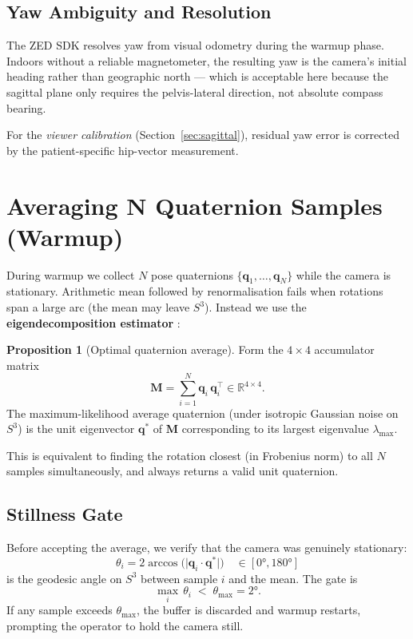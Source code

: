 \documentclass[11pt, a4paper]{article}
\newcommand{\R}{\mathbb{R}}
\newcommand{\mat}[1]{\mathbf{#1}}     %
\newcommand{\quat}[1]{\bm{#1}}        %
\theoremstyle{definition}
\newtheorem{prop}{Proposition}
\begin{document}
\subsection*{Yaw Ambiguity and Resolution}
The ZED SDK resolves yaw from visual odometry during the warmup phase.
Indoors without a reliable magnetometer, the resulting yaw is the camera's
initial heading rather than geographic north --- which is acceptable here
because the sagittal plane only requires the pelvis-lateral direction, not
absolute compass bearing.

For the \emph{viewer calibration} (Section~\ref{sec:sagittal}), residual yaw
error is corrected by the patient-specific hip-vector measurement.

\section{Averaging N Quaternion Samples (Warmup)}
\label{sec:avg_quat}

During warmup we collect $N$ pose quaternions
$\{\quat{q}_1, \dots, \quat{q}_N\}$ while the camera is stationary.
Arithmetic mean followed by renormalisation fails when rotations span
a large arc (the mean may leave $S^3$). Instead we use the
\textbf{eigendecomposition estimator} \cite{Markley2007}:

\begin{prop}[Optimal quaternion average]
Form the $4 \times 4$ accumulator matrix
\[
  \mat{M} = \sum_{i=1}^{N} \quat{q}_i\,\quat{q}_i^{\!\top} \in \R^{4\times 4}.
\]
The maximum-likelihood average quaternion (under isotropic Gaussian noise on
$S^3$) is the unit eigenvector $\quat{q}^*$ of $\mat{M}$ corresponding to its
largest eigenvalue $\lambda_{\max}$.
\end{prop}

\noindent This is equivalent to finding the rotation closest (in Frobenius norm)
to all $N$ samples simultaneously, and always returns a valid unit quaternion.

\subsection*{Stillness Gate}
\label{sec:stillness}
Before accepting the average, we verify that the camera was genuinely stationary:
\[
  \theta_i = 2\arccos\!\bigl(\lvert \quat{q}_i \cdot \quat{q}^* \rvert\bigr)
  \quad \in [0°, 180°]
\]
is the geodesic angle on $S^3$ between sample $i$ and the mean.  The gate is
\[
  \max_{i}\,\theta_i \;<\; \theta_{\max} = 2°.
\]
If any sample exceeds $\theta_{\max}$, the buffer is discarded and warmup
restarts, prompting the operator to hold the camera still.
\end{document}
